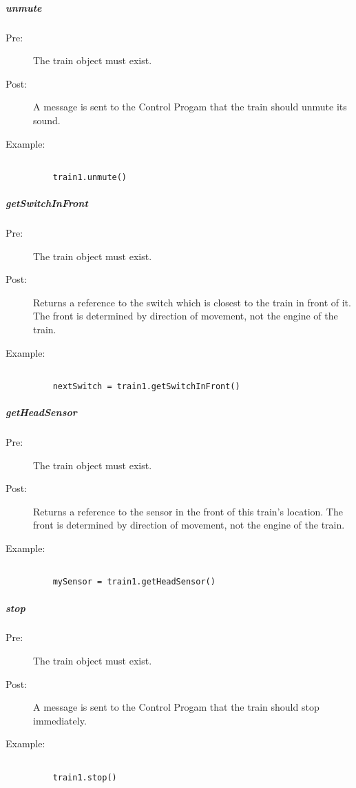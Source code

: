 \documentclass[a4paper,11pt,notitlepage]{article}
\def\CS{Control Progam\xspace}
\begin{document}
\subparagraph{unmute}
\begin{description}
\item[\hspace{1cm}Pre:] The train object must exist.
\item[\hspace{1cm}Post:] A message is sent to the \CS that the train should unmute its sound.
\item[\hspace{1cm}Example:]
\begin{verbatim}

    train1.unmute()
\end{verbatim}
\end{description}

\subparagraph{getSwitchInFront}
\begin{description}
\item[\hspace{1cm}Pre:] The train object must exist.
\item[\hspace{1cm}Post:] Returns a reference to the switch which is closest to the train in front of it. The front is determined by direction of movement, not the engine of the train.
\item[\hspace{1cm}Example:]
\begin{verbatim}

    nextSwitch = train1.getSwitchInFront()
\end{verbatim}
\end{description}

\subparagraph{getHeadSensor}
\begin{description}
\item[\hspace{1cm}Pre:] The train object must exist.
\item[\hspace{1cm}Post:] Returns a reference to the sensor in the front of this train's location. The front is determined by direction of movement, not the engine of the train.
\item[\hspace{1cm}Example:]
\begin{verbatim}

    mySensor = train1.getHeadSensor()
\end{verbatim}
\end{description}

\subparagraph{stop}
\begin{description}
\item[\hspace{1cm}Pre:] The train object must exist.
\item[\hspace{1cm}Post:] A message is sent to the \CS that the train should stop immediately.
\item[\hspace{1cm}Example:]
\begin{verbatim}

    train1.stop()
\end{verbatim}
\end{description}
\end{document}
